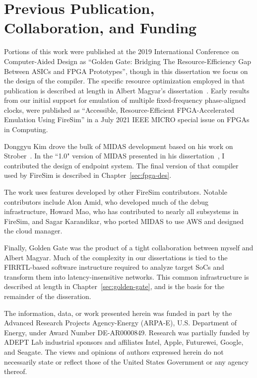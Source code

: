 \section{Previous Publication, Collaboration, and Funding}

Portions of this work were published at the 2019 International Conference on
Computer-Aided Design as ``Golden Gate: Bridging The Resource-Efficiency Gap
Between ASICs and FPGA Prototypes'', though in this dissertation we focus on
the design of the compiler. The specific resource optimization employed in that
publication is described at length in Albert Magyar's dissertation~\cite{MagyarDissertation}.  Early results
from our initial support for emulation of multiple fixed-frequency
phase-aligned clocks, were published as ``Accessible, Resource-Efficient
FPGA-Accelerated Emulation Using FireSim'' in a July 2021 IEEE MICRO special
issue on FPGAs in Computing.

Donggyu Kim drove the bulk of MIDAS development based on his work on
Strober~\cite{Strober}. In the ``1.0" version of MIDAS presented in his
dissertation~\cite{DGKDissertation}, I contributed the design of endpoint
system. The final version of that compiler used by FireSim is described in
Chapter~\ref{sec:fpga-des}.

The work uses features developed by other FireSim contributors. Notable
contributors include Alon Amid, who developed much of the debug infrastructure,
Howard Mao, who has contributed to nearly all subsystems in FireSim, and Sagar
Karandikar, who ported MIDAS to use AWS and designed the cloud manager.

Finally, Golden Gate was the product of a tight collaboration between myself
and Albert Magyar. Much of the complexity in our dissertations is tied to the
FIRRTL-based software instructure required to analyze target SoCs and transform
them into latency-insensitive networks. This common infrastructure is described
at length in Chapter~\ref{sec:golden-gate}, and is the basis for the remainder
of the disseration.

The information, data, or work presented herein was funded in part by the
Advanced Research Projects Agency-Energy (ARPA-E), U.S. Department of Energy,
under Award Number DE-AR0000849.  Research was partially funded by ADEPT Lab
industrial sponsors and affiliates Intel, Apple, Futurewei, Google, and
Seagate.  The views and opinions of authors expressed herein do not necessarily
state or reflect those of the United States Government or any agency thereof.

